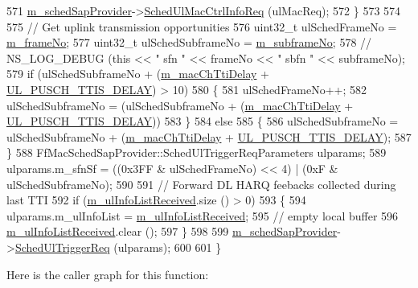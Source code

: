 \begin{DoxyCode}
571       \hyperlink{classns3_1_1LteEnbMac_a48a4fe366fd18025fb8ebe4a3de2a143}{m\_schedSapProvider}->\hyperlink{classns3_1_1FfMacSchedSapProvider_a00fdc735b5f273ce448bd465097e1370}{SchedUlMacCtrlInfoReq} (ulMacReq);
572     \}
573 
574 
575   \textcolor{comment}{// Get uplink transmission opportunities}
576   uint32\_t ulSchedFrameNo = \hyperlink{classns3_1_1LteEnbMac_a1ca20e5d0d321f28dc931bdcccadfada}{m\_frameNo};
577   uint32\_t ulSchedSubframeNo = \hyperlink{classns3_1_1LteEnbMac_adccfd57ac8aedd1182963517546fde38}{m\_subframeNo};
578   \textcolor{comment}{//   NS\_LOG\_DEBUG (this << " sfn " << frameNo << " sbfn " << subframeNo);}
579   \textcolor{keywordflow}{if} (ulSchedSubframeNo + (\hyperlink{classns3_1_1LteEnbMac_a931e5e94323309225b902f9ce78bf1af}{m\_macChTtiDelay} + \hyperlink{lte-common_8h_afbe3b423f9aed03e1ef065bf3753a6d4}{UL\_PUSCH\_TTIS\_DELAY}) > 10)
580     \{
581       ulSchedFrameNo++;
582       ulSchedSubframeNo = (ulSchedSubframeNo + (\hyperlink{classns3_1_1LteEnbMac_a931e5e94323309225b902f9ce78bf1af}{m\_macChTtiDelay} + 
      \hyperlink{lte-common_8h_afbe3b423f9aed03e1ef065bf3753a6d4}{UL\_PUSCH\_TTIS\_DELAY})) %
583     \}
584   \textcolor{keywordflow}{else}
585     \{
586       ulSchedSubframeNo = ulSchedSubframeNo + (\hyperlink{classns3_1_1LteEnbMac_a931e5e94323309225b902f9ce78bf1af}{m\_macChTtiDelay} + 
      \hyperlink{lte-common_8h_afbe3b423f9aed03e1ef065bf3753a6d4}{UL\_PUSCH\_TTIS\_DELAY});
587     \}
588   FfMacSchedSapProvider::SchedUlTriggerReqParameters ulparams;
589   ulparams.m\_sfnSf = ((0x3FF & ulSchedFrameNo) << 4) | (0xF & ulSchedSubframeNo);
590 
591   \textcolor{comment}{// Forward DL HARQ feebacks collected during last TTI}
592   \textcolor{keywordflow}{if} (\hyperlink{classns3_1_1LteEnbMac_afe760dd4bbfb8ce89febb8f2265edd5e}{m\_ulInfoListReceived}.size () > 0)
593     \{
594      ulparams.m\_ulInfoList = \hyperlink{classns3_1_1LteEnbMac_afe760dd4bbfb8ce89febb8f2265edd5e}{m\_ulInfoListReceived};
595       \textcolor{comment}{// empty local buffer}
596       \hyperlink{classns3_1_1LteEnbMac_afe760dd4bbfb8ce89febb8f2265edd5e}{m\_ulInfoListReceived}.clear ();
597     \}
598 
599   \hyperlink{classns3_1_1LteEnbMac_a48a4fe366fd18025fb8ebe4a3de2a143}{m\_schedSapProvider}->\hyperlink{classns3_1_1FfMacSchedSapProvider_a7bd978ea17a587a1626ef684be006c04}{SchedUlTriggerReq} (ulparams);
600 
601 \}
\end{DoxyCode}


Here is the caller graph for this function\+:



